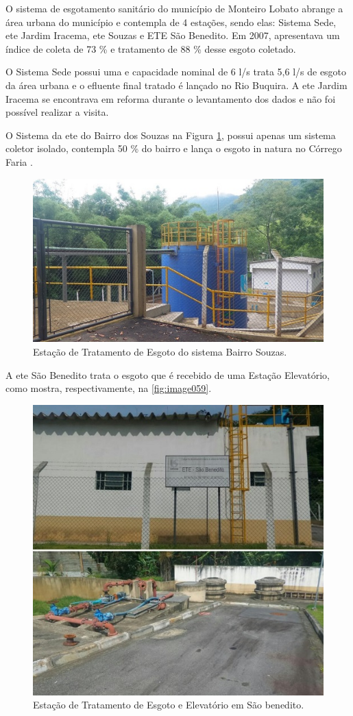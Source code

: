 	O sistema de esgotamento sanitário do município de Monteiro Lobato abrange a área urbana do município e contempla de 4 estações, sendo elas: Sistema Sede, \gls{ete} Jardim Iracema, \gls{ete} Souzas e ETE São Benedito. Em 2007, apresentava um índice de coleta de 73 \% e tratamento de 88 \% desse esgoto coletado. 

	O Sistema Sede possui uma e capacidade nominal de 6 l/s trata 5,6 l/s de esgoto da área urbana e o efluente final tratado é lançado no Rio Buquira. A \gls{ete} Jardim Iracema se encontrava em reforma durante o levantamento dos dados e não foi possível realizar a visita. 
	
	O Sistema da \gls{ete} do Bairro dos Souzas na Figura \ref{fig:image058}, possui apenas um sistema coletor isolado, contempla 50 \% do bairro e lança o esgoto in natura no Córrego Faria \cite{MonteiroLobato}. 
	
	\begin{figure}
		\centering
		\includegraphics[width=0.75\linewidth]{produtos/prodtres/image058}
		\caption{Estação de Tratamento de Esgoto do sistema Bairro Souzas.}
		\label{fig:image058}
	\end{figure}
	
	
	A \gls{ete} São Benedito trata o esgoto que é recebido de uma Estação Elevatório, como mostra, respectivamente, na \autoref{fig:image059}. 
	
	\begin{figure}
		\centering
		\includegraphics[width=0.75\linewidth]{produtos/prodtres/image059}
		\caption{Estação de Tratamento de Esgoto e Elevatório em São benedito.}
		\label{fig:image059}
	\end{figure}
	
